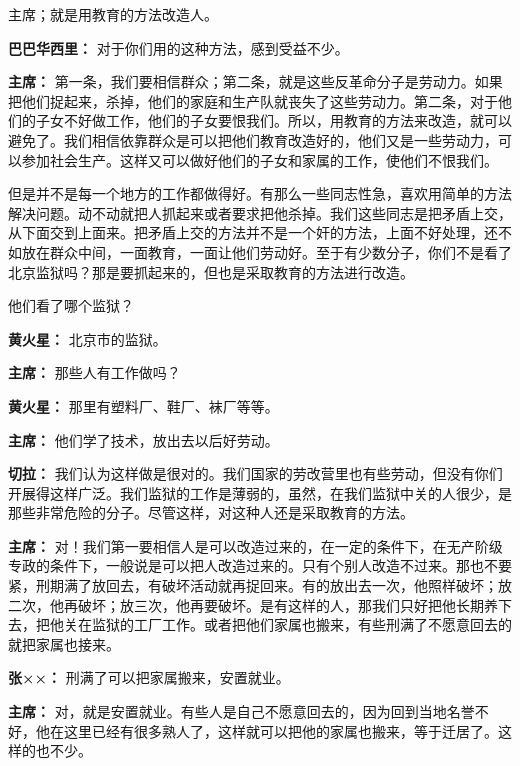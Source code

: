 \begin{duihua}
主席；就是用教育的方法改造人。

\item[\textbf{巴巴华西里：}] 对于你们用的这种方法，感到受益不少。

\item[\textbf{主席：}] 第一条，我们要相信群众；第二条，就是这些反革命分子是劳动力。如果把他们捉起来，杀掉，他们的家庭和生产队就丧失了这些劳动力。第二条，对于他们的子女不好做工作，他们的子女要恨我们。所以，用教育的方法来改造，就可以避免了。我们相信依靠群众是可以把他们教育改造好的，他们又是一些劳动力，可以参加社会生产。这样又可以做好他们的子女和家属的工作，使他们不恨我们。

但是并不是每一个地方的工作都做得好。有那么一些同志性急，喜欢用简单的方法解决问题。动不动就把人抓起来或者要求把他杀掉。我们这些同志是把矛盾上交，从下面交到上面来。把矛盾上交的方法并不是一个奸的方法，上面不好处理，还不如放在群众中间，一面教育，一面让他们劳动好。至于有少数分子，你们不是看了北京监狱吗？那是要抓起来的，但也是采取教育的方法进行改造。

他们看了哪个监狱？

\item[\textbf{黄火星：}] 北京市的监狱。

\item[\textbf{主席：}] 那些人有工作做吗？

\item[\textbf{黄火星：}] 那里有塑料厂、鞋厂、袜厂等等。

\item[\textbf{主席：}] 他们学了技术，放出去以后好劳动。

\item[\textbf{切拉：}] 我们认为这样做是很对的。我们国家的劳改营里也有些劳动，但没有你们开展得这样广泛。我们监狱的工作是薄弱的，虽然，在我们监狱中关的人很少，是那些非常危险的分子。尽管这样，对这种人还是采取教育的方法。

\item[\textbf{主席：}] 对！我们第一要相信人是可以改造过来的，在一定的条件下，在无产阶级专政的条件下，一般说是可以把人改造过来的。只有个别人改造不过来。那也不要紧，刑期满了放回去，有破坏活动就再捉回来。有的放出去一次，他照样破坏；放二次，他再破坏；放三次，他再要破坏。是有这样的人，那我们只好把他长期养下去，把他关在监狱的工厂工作。或者把他们家属也搬来，有些刑满了不愿意回去的就把家属也接来。

\item[\textbf{张××：}] 刑满了可以把家属搬来，安置就业。

\item[\textbf{主席：}] 对，就是安置就业。有些人是自己不愿意回去的，因为回到当地名誉不好，他在这里已经有很多熟人了，这样就可以把他的家属也搬来，等于迁居了。这样的也不少。


\end{duihua}
